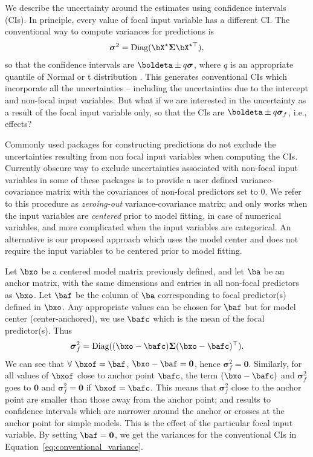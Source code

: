 We describe the uncertainty around the estimates using confidence intervals (CIs). In principle, every value of focal input variable has a different CI. The conventional way to compute variances for predictions is 
%
\begin{align}\label{eq:conventional_variance}
\boldsymbol\sigma^2 = \textrm{Diag}(\bX^\star \boldsymbol{\Sigma} \bX^{\star\top}), 
\end{align}
so that the confidence intervals are $\boldeta \pm q\boldsymbol\sigma$, where $q$ is an appropriate quantile of Normal or t distribution \citep{lenth2018package, fox2009effect}. This generates conventional CIs which incorporate all the uncertainties -- including the uncertainties due to the intercept and non-focal input variables.  But what if we are interested in the uncertainty as a result of the focal input variable only, so that the CIs are $\boldeta \pm q \boldsymbol \sigma_f$, i.e., effects? 

Commonly used  packages for constructing predictions do not exclude the uncertainties resulting from non focal input variables when computing the CIs.  Currently obscure way to exclude uncertainties associated with non-focal input variables in some of these packages is to provide a user defined variance-covariance matrix with the covariances of non-focal predictors set to $0$. We refer to this procedure as \emph{zeroing-out} variance-covariance matrix; and only works when the input variables are \emph{centered} prior to model fitting, in case of numerical variables, and more complicated when the input variables are categorical. An alternative is our proposed approach which uses the model center and does not require the input variables to be centered prior to model fitting.

Let $\bxo$ be a centered model matrix previously defined, and let $\ba$ be an anchor matrix, with the same dimensions and entries in all non-focal predictors as $\bxo$. Let $\baf$ be the column of $\ba$ corresponding to focal predictor(s) defined in $\bxo$. Any appropriate values can be chosen for $\baf$ but for model center (center-anchored), we use $\bafc$ which is the mean of the focal predictor(s). Thus 
%
\begin{align}\label{eq:centered_variance}
\boldsymbol\sigma_f^2 = \textrm{Diag}((\bxo - \bafc) \boldsymbol{\Sigma} (\bxo - \bafc)^\top).
\end{align}
%
We can see that $\forall ~\bxof=\baf$, $\bxo - \baf = \boldsymbol 0$, hence $\boldsymbol\sigma_f^2 = \boldsymbol{0}$. Similarly, for all values of $\bxof$ close to anchor point $\bafc$, the term $(\bxo - \bafc)$ and $\boldsymbol\sigma_f^2$ goes to $\boldsymbol 0$ and $\boldsymbol\sigma_f^2 = \boldsymbol 0$ if $\bxof=\bafc$. This means that $\boldsymbol\sigma_f^2$ close to the anchor point are smaller than those away from the anchor point; and results to confidence intervals which are narrower around the anchor or crosses at the anchor point for simple models. This is the effect of the particular focal input variable. By setting $\baf = \boldsymbol 0$, we get the variances for the conventional CIs in Equation~\ref{eq:conventional_variance}.


